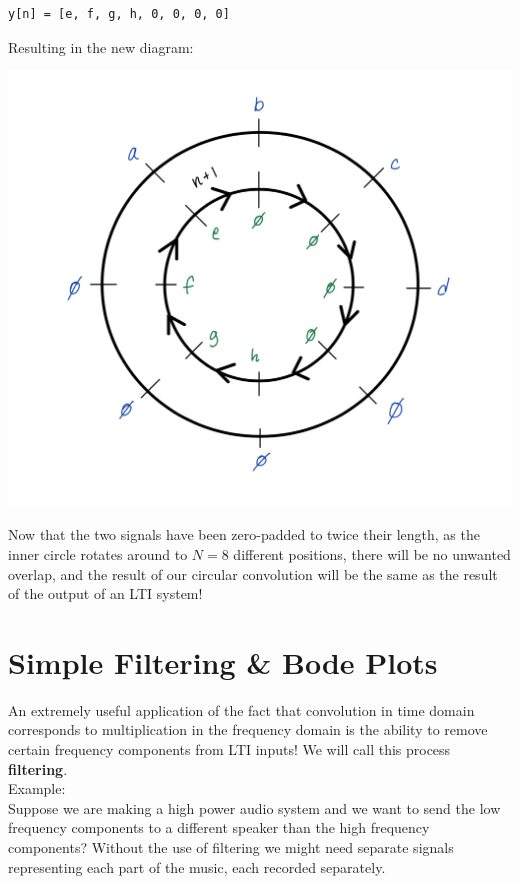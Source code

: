 \documentclass[a4paper]{article}
\numberwithin{equation}{section}
\begin{document}
\begin{verbatim}
y[n] = [e, f, g, h, 0, 0, 0, 0]
\end{verbatim}
Resulting in the new diagram: 
\begin{center}
\includegraphics[scale=0.39]{circfixed.png}
\end{center}

Now that the two signals have been zero-padded to twice their length, as the inner circle rotates around to $N=8$ different positions, there will be no unwanted overlap, and the result of our circular convolution will be the same as the result of the output of an LTI system!


\section{Simple Filtering \& Bode Plots}
An extremely useful application of the fact that convolution in time domain corresponds to multiplication in the frequency domain is the ability to remove certain frequency components from LTI inputs! We will call this process \textbf{filtering}.\\

Example:\\
Suppose we are making a high power audio system and we want to send the low frequency components to a different speaker than the high frequency components? Without the use of filtering we might need separate signals representing each part of the music, each recorded separately. \\
\end{document}
